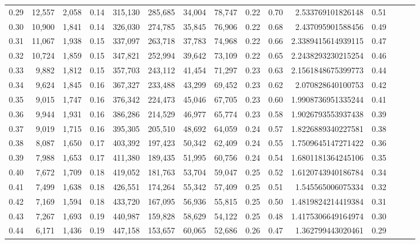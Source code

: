 \begin{tabular}{rrrrrrrrrrrrrrr}
0.29 &  12,557 &  2,058 &  0.14 &  315,130 &  285,685 &   34,004 &   78,747 &  0.22 &  0.70 &     2.533769101826148 &      0.51 \\
0.30 &  10,900 &  1,841 &  0.14 &  326,030 &  274,785 &   35,845 &   76,906 &  0.22 &  0.68 &     2.437095901588456 &      0.49 \\
0.31 &  11,067 &  1,938 &  0.15 &  337,097 &  263,718 &   37,783 &   74,968 &  0.22 &  0.66 &    2.3389415614939115 &      0.47 \\
0.32 &  10,724 &  1,859 &  0.15 &  347,821 &  252,994 &   39,642 &   73,109 &  0.22 &  0.65 &    2.2438293230215254 &      0.46 \\
0.33 &   9,882 &  1,812 &  0.15 &  357,703 &  243,112 &   41,454 &   71,297 &  0.23 &  0.63 &    2.1561848675399773 &      0.44 \\
0.34 &   9,624 &  1,845 &  0.16 &  367,327 &  233,488 &   43,299 &   69,452 &  0.23 &  0.62 &     2.070828640100753 &      0.42 \\
0.35 &   9,015 &  1,747 &  0.16 &  376,342 &  224,473 &   45,046 &   67,705 &  0.23 &  0.60 &    1.9908736951335244 &      0.41 \\
0.36 &   9,944 &  1,931 &  0.16 &  386,286 &  214,529 &   46,977 &   65,774 &  0.23 &  0.58 &    1.9026793553937438 &      0.39 \\
0.37 &   9,019 &  1,715 &  0.16 &  395,305 &  205,510 &   48,692 &   64,059 &  0.24 &  0.57 &    1.8226889340227581 &      0.38 \\
0.38 &   8,087 &  1,650 &  0.17 &  403,392 &  197,423 &   50,342 &   62,409 &  0.24 &  0.55 &    1.7509645147271422 &      0.36 \\
0.39 &   7,988 &  1,653 &  0.17 &  411,380 &  189,435 &   51,995 &   60,756 &  0.24 &  0.54 &    1.6801181364245106 &      0.35 \\
0.40 &   7,672 &  1,709 &  0.18 &  419,052 &  181,763 &   53,704 &   59,047 &  0.25 &  0.52 &    1.6120743940186784 &      0.34 \\
0.41 &   7,499 &  1,638 &  0.18 &  426,551 &  174,264 &   55,342 &   57,409 &  0.25 &  0.51 &     1.545565006075334 &      0.32 \\
0.42 &   7,169 &  1,594 &  0.18 &  433,720 &  167,095 &   56,936 &   55,815 &  0.25 &  0.50 &    1.4819824214419384 &      0.31 \\
0.43 &   7,267 &  1,693 &  0.19 &  440,987 &  159,828 &   58,629 &   54,122 &  0.25 &  0.48 &    1.4175306649164974 &      0.30 \\
0.44 &   6,171 &  1,436 &  0.19 &  447,158 &  153,657 &   60,065 &   52,686 &  0.26 &  0.47 &     1.362799443020461 &      0.29 \\

\end{tabular}
